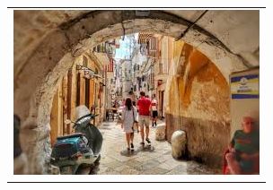 \documentclass[
	openany, %
	parskip=full, %
	12pt, %
	a4paper, %
]{conferencebooklet} %
\begin{document}
\begin{adjustwidth}{10pt}{20pt}
\begin{table}[h!]
{\begin{tabular}{p{60mm}}
            \vspace{2mm}
            \centering
            \includegraphics[width=\linewidth]{images/useful_info/discover-bari/bari-vecchia.jpg}
        \end{tabular}
            }
\end{table}

\vspace{-4mm}
\begin{table}[h!]
\end{table}
\end{adjustwidth}
\end{document}
